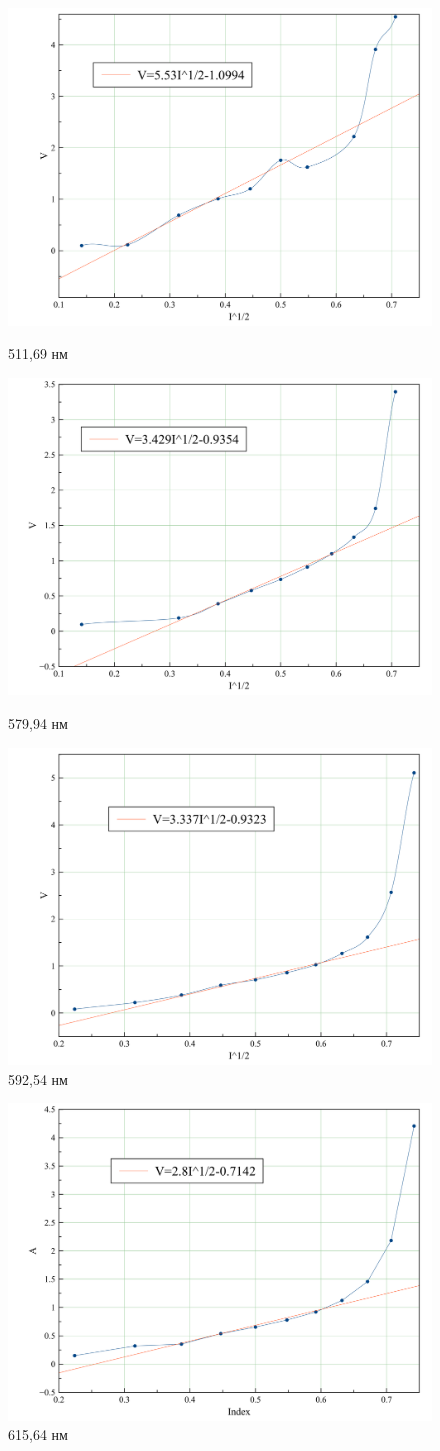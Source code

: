 \documentclass[a4paper,12pt]{article}
\begin{document}
				\begin{center}
					\begin{figure}
						\centering
						\includegraphics[width=0.6\linewidth]{1886}
						\caption{511,69 нм}
						
						\centering
						\includegraphics[width=0.6\linewidth]{2146}
						\caption{579,94 нм}
						
						\centering
						\includegraphics[width=0.6\linewidth]{2194}
						\caption{592,54 нм}
					\end{figure}
					\begin{figure}
						\centering
						\includegraphics[width=0.6\linewidth]{2282}
						\caption{615,64 нм}
						

\end{figure}
\end{center}
\end{document}
